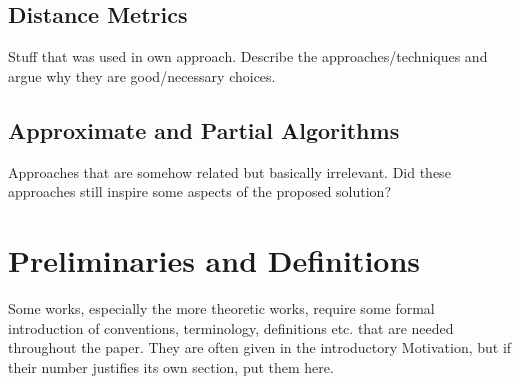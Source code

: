 \subsection{Distance Metrics}

Stuff that was used in own approach. Describe the approaches/techniques and argue why they are good/necessary choices.

\subsection{Approximate and Partial Algorithms}

Approaches that are somehow related but basically irrelevant. Did these approaches still inspire some aspects of the proposed solution?

\section{Preliminaries and Definitions}
\label{sec:definitions}

Some works, especially the more theoretic works, require some formal introduction of conventions, terminology, definitions etc. that are needed throughout the paper. They are often given in the introductory Motivation, but if their number justifies its own section, put them here.
